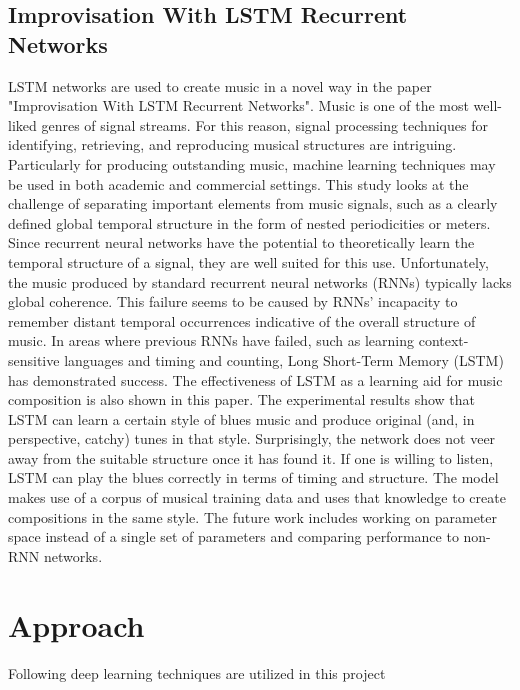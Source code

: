 \documentclass[letterpaper]{article}
\begin{document}
\subsection{Improvisation With LSTM Recurrent Networks}

LSTM networks are used to create music in a novel way in the paper "Improvisation With LSTM Recurrent Networks". Music is one of the most well-liked genres of signal streams. For this reason, signal processing techniques for identifying, retrieving, and reproducing musical structures are intriguing. Particularly for producing outstanding music, machine learning techniques may be used in both academic and commercial settings. This study looks at the challenge of separating important elements from music signals, such as a clearly defined global temporal structure in the form of nested periodicities or meters. Since recurrent neural networks have the potential to theoretically learn the temporal structure of a signal, they are well suited for this use. Unfortunately, the music produced by standard recurrent neural networks (RNNs) typically lacks global coherence. This failure seems to be caused by RNNs' incapacity to remember distant temporal occurrences indicative of the overall structure of music. In areas where previous RNNs have failed, such as learning context-sensitive languages and timing and counting, Long Short-Term Memory (LSTM) has demonstrated success. The effectiveness of LSTM as a learning aid for music composition is also shown in this paper. The experimental results show that LSTM can learn a certain style of blues music and produce original (and, in perspective, catchy) tunes in that style. Surprisingly, the network does not veer away from the suitable structure once it has found it. If one is willing to listen, LSTM can play the blues correctly in terms of timing and structure. The model makes use of a corpus of musical training data and uses that knowledge to create compositions in the same style. The future work includes working on parameter space instead of a single set of parameters and comparing performance to non-RNN networks.

\section{Approach}
Following deep learning techniques are utilized in this project
\end{document}
